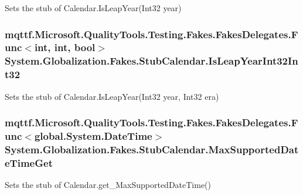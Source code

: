 Sets the stub of Calendar.\-Is\-Leap\-Year(\-Int32 year)

\hypertarget{class_system_1_1_globalization_1_1_fakes_1_1_stub_calendar_a16839d657b3c5f3bc3d4754ace33a3ba}{
\subsubsection[{Is\-Leap\-Year\-Int32\-Int32}]{\setlength{\rightskip}{0pt plus 5cm}mqttf.\-Microsoft.\-Quality\-Tools.\-Testing.\-Fakes.\-Fakes\-Delegates.\-Func$<$int, int, bool$>$ System.\-Globalization.\-Fakes.\-Stub\-Calendar.\-Is\-Leap\-Year\-Int32\-Int32}}\label{class_system_1_1_globalization_1_1_fakes_1_1_stub_calendar_a16839d657b3c5f3bc3d4754ace33a3ba}


Sets the stub of Calendar.\-Is\-Leap\-Year(\-Int32 year, Int32 era)

\hypertarget{class_system_1_1_globalization_1_1_fakes_1_1_stub_calendar_a97bd3888262c80d79a0affc28177d8f3}{
\subsubsection[{Max\-Supported\-Date\-Time\-Get}]{\setlength{\rightskip}{0pt plus 5cm}mqttf.\-Microsoft.\-Quality\-Tools.\-Testing.\-Fakes.\-Fakes\-Delegates.\-Func$<$global.\-System.\-Date\-Time$>$ System.\-Globalization.\-Fakes.\-Stub\-Calendar.\-Max\-Supported\-Date\-Time\-Get}}\label{class_system_1_1_globalization_1_1_fakes_1_1_stub_calendar_a97bd3888262c80d79a0affc28177d8f3}


Sets the stub of Calendar.\-get\-\_\-\-Max\-Supported\-Date\-Time()

